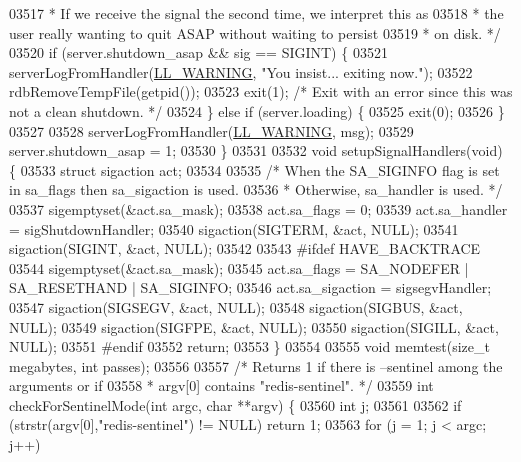 \begin{DoxyCode}
{{{{{{{{{{{{{{{{{{{{{{{{{{{{{{{{{{{{{{{{{{{{{{{{{{{{{{{{{{{{{{{{{{{{{{{{{{{{{{{{{{{{{{{{{{{{{{{{{{{{{{{{{{{{{{{{{{{{{{{{{{{{{{{{{{{{{{{{{{{{{{{{{{{{{{{{{{{{{{{{{{{{{{{{{{{{03517 \textcolor{comment}{     * If we receive the signal the second time, we interpret this as}
03518 \textcolor{comment}{     * the user really wanting to quit ASAP without waiting to persist}
03519 \textcolor{comment}{     * on disk. */}
03520     \textcolor{keywordflow}{if} (server.shutdown\_asap && sig == SIGINT) \{
03521         serverLogFromHandler(\hyperlink{server_8h_a31229b9334bba7d6be2a72970967a14b}{LL\_WARNING}, \textcolor{stringliteral}{"You insist... exiting now."});
03522         rdbRemoveTempFile(getpid());
03523         exit(1); \textcolor{comment}{/* Exit with an error since this was not a clean shutdown. */}
03524     \} \textcolor{keywordflow}{else} \textcolor{keywordflow}{if} (server.loading) \{
03525         exit(0);
03526     \}
03527 
03528     serverLogFromHandler(\hyperlink{server_8h_a31229b9334bba7d6be2a72970967a14b}{LL\_WARNING}, msg);
03529     server.shutdown\_asap = 1;
03530 \}
03531 
03532 \textcolor{keywordtype}{void} setupSignalHandlers(\textcolor{keywordtype}{void}) \{
03533     \textcolor{keyword}{struct} sigaction act;
03534 
03535     \textcolor{comment}{/* When the SA\_SIGINFO flag is set in sa\_flags then sa\_sigaction is used.}
03536 \textcolor{comment}{     * Otherwise, sa\_handler is used. */}
03537     sigemptyset(&act.sa\_mask);
03538     act.sa\_flags = 0;
03539     act.sa\_handler = sigShutdownHandler;
03540     sigaction(SIGTERM, &act, NULL);
03541     sigaction(SIGINT, &act, NULL);
03542 
03543 \textcolor{preprocessor}{#}\textcolor{preprocessor}{ifdef} HAVE\_BACKTRACE
03544     sigemptyset(&act.sa\_mask);
03545     act.sa\_flags = SA\_NODEFER | SA\_RESETHAND | SA\_SIGINFO;
03546     act.sa\_sigaction = sigsegvHandler;
03547     sigaction(SIGSEGV, &act, NULL);
03548     sigaction(SIGBUS, &act, NULL);
03549     sigaction(SIGFPE, &act, NULL);
03550     sigaction(SIGILL, &act, NULL);
03551 \textcolor{preprocessor}{#}\textcolor{preprocessor}{endif}
03552     \textcolor{keywordflow}{return};
03553 \}
03554 
03555 \textcolor{keywordtype}{void} memtest(size\_t megabytes, \textcolor{keywordtype}{int} passes);
03556 
03557 \textcolor{comment}{/* Returns 1 if there is --sentinel among the arguments or if}
03558 \textcolor{comment}{ * argv[0] contains "redis-sentinel". */}
03559 \textcolor{keywordtype}{int} checkForSentinelMode(\textcolor{keywordtype}{int} argc, \textcolor{keywordtype}{char} **argv) \{
03560     \textcolor{keywordtype}{int} j;
03561 
03562     \textcolor{keywordflow}{if} (strstr(argv[0],\textcolor{stringliteral}{"redis-sentinel"}) != NULL) \textcolor{keywordflow}{return} 1;
03563     \textcolor{keywordflow}{for} (j = 1; j < argc; j++)
}}}}}}}}}}}}}}}}}}}}}}}}}}}}}}}}}}}}}}}}}}}}}}}}}}}}}}}}}}}}}}}}}}}}}}}}}}}}}}}}}}}}}}}}}}}}}}}}}}}}}}}}}}}}}}}}}}}}}}}}}}}}}}}}}}}}}}}}}}}}}}}}}}}}}}}}}}}}}}}}}}}}}}}}}}}}
\end{DoxyCode}
